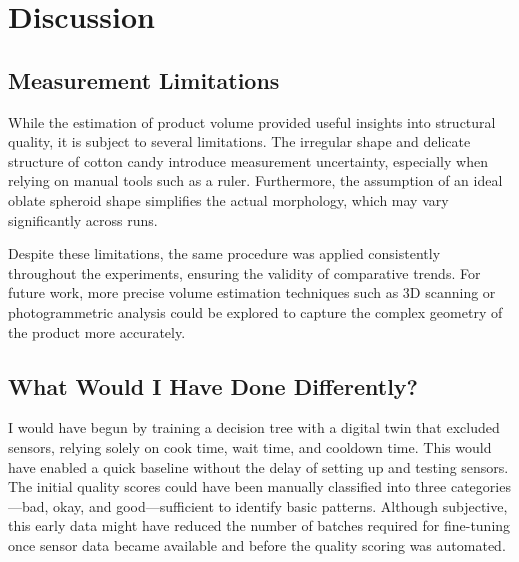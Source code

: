 \chapter{Discussion}
\label{sec:discussion}

\section{Measurement Limitations}

While the estimation of product volume provided useful insights into structural quality, it is subject to several limitations. The irregular shape and delicate structure of cotton candy introduce measurement uncertainty, especially when relying on manual tools such as a ruler. Furthermore, the assumption of an ideal oblate spheroid shape simplifies the actual morphology, which may vary significantly across runs.

Despite these limitations, the same procedure was applied consistently throughout the experiments, ensuring the validity of comparative trends. For future work, more precise volume estimation techniques such as 3D scanning or photogrammetric analysis could be explored to capture the complex geometry of the product more accurately.

\section{What Would I Have Done Differently?}
I would have begun by training a decision tree with a digital twin that excluded sensors, relying solely on cook time, wait time, and cooldown time. This would have enabled a quick baseline without the delay of setting up and testing sensors. The initial quality scores could have been manually classified into three categories—bad, okay, and good—sufficient to identify basic patterns. Although subjective, this early data might have reduced the number of batches required for fine-tuning once sensor data became available and before the quality scoring was automated. 